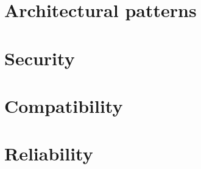 
\section{Architectural patterns}
\label{sec:patterns}


\section{Security}
\label{csec:security}


\section{Compatibility}
\label{sec:compatibility}


\section{Reliability}
\label{sec:reliability}
